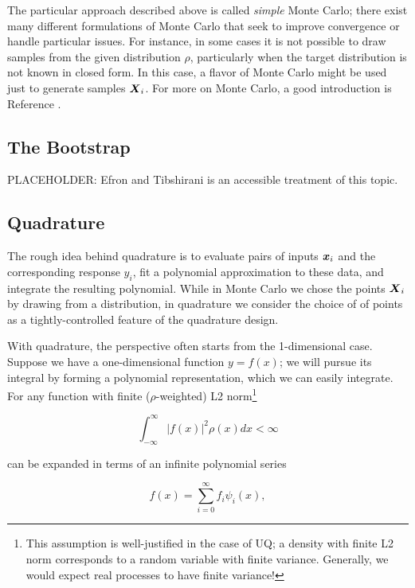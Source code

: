 \documentclass[../primer.tex]{subfiles}
\begin{document}
The particular approach described above is called \emph{simple} Monte Carlo;
there exist many different formulations of Monte Carlo that seek to improve
convergence or handle particular issues. For instance, in some cases it is not
possible to draw samples from the given distribution $\rho$, particularly when
the target distribution is not known in closed form. In this case, a flavor of
Monte Carlo might be used just to generate samples $\boldsymbol{X}_i$. For more on Monte
Carlo, a good introduction is Reference \cite{owen2013montecarlo}.

\subsection{The Bootstrap}
PLACEHOLDER: Efron and Tibshirani\cite{efron1986} is an accessible treatment of
this topic.

\subsection{Quadrature}
The rough idea behind quadrature is to evaluate pairs of inputs $\boldsymbol{x}_i$ and the
corresponding response $y_i$, fit a polynomial approximation to these data, and
integrate the resulting polynomial. While in Monte Carlo we chose the points
$\boldsymbol{X}_i$ by drawing from a distribution, in quadrature we consider the choice of
of points as a tightly-controlled feature of the quadrature design.

With quadrature, the perspective often starts from the 1-dimensional case.
Suppose we have a one-dimensional function $y = f(x)$; we will pursue its
integral by forming a polynomial representation, which we can easily integrate.
For any function with finite ($\rho$-weighted) L2 norm\footnote{This assumption
  is well-justified in the case of UQ; a density with finite L2 norm corresponds
  to a random variable with finite variance. Generally, we would expect real
  processes to have finite variance!}

\begin{equation}
  \int_{-\infty}^{\infty} |f(x)|^2 \rho(x) dx < \infty
\end{equation}

\noindent can be expanded in terms of an infinite polynomial series

\begin{equation} \label{eq:poly-expansion}
  f(x) = \sum_{i=0}^{\infty} f_i \psi_i(x),
\end{equation}
\end{document}
